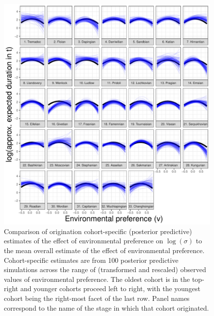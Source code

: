 \documentclass{article}
\begin{document}
\begin{figure}[ht]
  \centering
  \includegraphics[width = \textwidth,height = 0.8\textheight,keepaspectratio=true]{figure/env_cohort_2}
  \caption{Comparison of origination cohort-specific (posterior predictive) estimates of the effect of environmental preference on \(\log(\sigma)\) to the mean overall estimate of the effect of environmental preference. Cohort-specific estimates are from 100 posterior predictive simulations across the range of (transformed and rescaled) observed values of environmental preference. The oldest cohort is in the top-right and younger cohorts proceed left to right, with the youngest cohort being the right-most facet of the last row. Panel names correspond to the name of the stage in which that cohort originated.}
  \label{fig:env_cohort_med}
\end{figure}
\end{document}

